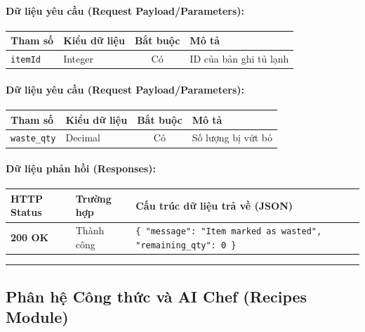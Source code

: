 \documentclass[12pt,a4paper]{article}
\begin{document}
\paragraph{Dữ liệu yêu cầu (Request Payload/Parameters):}
\begin{longtable}{|>{\raggedright\arraybackslash}p{2.8cm}|>{\raggedright\arraybackslash}p{2.2cm}|c|>{\raggedright\arraybackslash}p{7.0cm}|}
\hline
\textbf{Tham số} & \textbf{Kiểu dữ liệu} & \textbf{Bắt buộc} & \textbf{Mô tả} \\ \hline
\endhead
\texttt{itemId} & Integer & Có & ID của bản ghi tủ lạnh \\ \hline
\end{longtable}

\paragraph{Dữ liệu yêu cầu (Request Payload/Parameters):}
\begin{longtable}{|>{\raggedright\arraybackslash}p{2.8cm}|>{\raggedright\arraybackslash}p{2.2cm}|c|>{\raggedright\arraybackslash}p{7.0cm}|}
\hline
\textbf{Tham số} & \textbf{Kiểu dữ liệu} & \textbf{Bắt buộc} & \textbf{Mô tả} \\ \hline
\endhead
\texttt{waste\_qty} & Decimal & Có & Số lượng bị vứt bỏ \\ \hline
\end{longtable}

\paragraph{Dữ liệu phản hồi (Responses):}
\begin{longtable}{|>{\raggedright\arraybackslash}p{2.8cm}|>{\raggedright\arraybackslash}p{3.2cm}|>{\raggedright\arraybackslash}p{8.0cm}|}
\hline
\textbf{HTTP Status} & \textbf{Trường hợp} & \textbf{Cấu trúc dữ liệu trả về (JSON)} \\ \hline
\endhead
\textbf{200 OK} & Thành công & \texttt{\{ "message": "Item marked as wasted", "remaining\_qty": 0 \}} \\ \hline
\end{longtable}

\vskip 0.4cm
\noindent\rule{\textwidth}{0.3pt}
\vskip 0.4cm

\subsection{Phân hệ Công thức và AI Chef (Recipes Module)}
\end{document}
